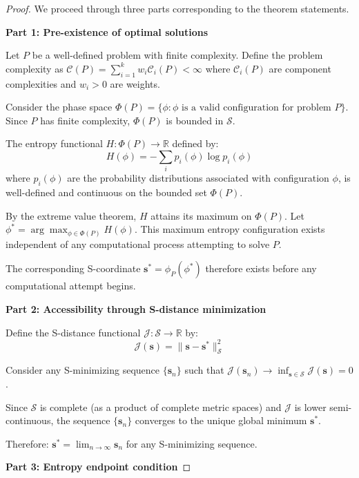 \documentclass[12pt,a4paper]{article}
\begin{document}
\begin{proof}
We proceed through three parts corresponding to the theorem statements.

\textbf{Part 1: Pre-existence of optimal solutions}

Let $P$ be a well-defined problem with finite complexity. Define the problem complexity as $\mathcal{C}(P) = \sum_{i=1}^k w_i \mathcal{C}_i(P) < \infty$ where $\mathcal{C}_i(P)$ are component complexities and $w_i > 0$ are weights.

Consider the phase space $\Phi(P) = \{\phi : \phi \text{ is a valid configuration for problem } P\}$. Since $P$ has finite complexity, $\Phi(P)$ is bounded in $\mathcal{S}$.

The entropy functional $H: \Phi(P) \to \mathbb{R}$ defined by:
\begin{equation}
H(\phi) = -\sum_{i} p_i(\phi) \log p_i(\phi)
\end{equation}
where $p_i(\phi)$ are the probability distributions associated with configuration $\phi$, is well-defined and continuous on the bounded set $\Phi(P)$.

By the extreme value theorem, $H$ attains its maximum on $\Phi(P)$. Let $\phi^* = \arg\max_{\phi \in \Phi(P)} H(\phi)$. This maximum entropy configuration exists independent of any computational process attempting to solve $P$.

The corresponding S-coordinate $\mathbf{s}^* = \phi_P(\phi^*)$ therefore exists before any computational attempt begins.

\textbf{Part 2: Accessibility through S-distance minimization}

Define the S-distance functional $\mathcal{J}: \mathcal{S} \to \mathbb{R}$ by:
\begin{equation}
\mathcal{J}(\mathbf{s}) = \|\mathbf{s} - \mathbf{s}^*\|_{\mathcal{S}}^2
\end{equation}

Consider any S-minimizing sequence $\{\mathbf{s}_n\}$ such that $\mathcal{J}(\mathbf{s}_n) \to \inf_{\mathbf{s} \in \mathcal{S}} \mathcal{J}(\mathbf{s}) = 0$.

Since $\mathcal{S}$ is complete (as a product of complete metric spaces) and $\mathcal{J}$ is lower semi-continuous, the sequence $\{\mathbf{s}_n\}$ converges to the unique global minimum $\mathbf{s}^*$.

Therefore: $\mathbf{s}^* = \lim_{n \to \infty} \mathbf{s}_n$ for any S-minimizing sequence.

\textbf{Part 3: Entropy endpoint condition}


\end{proof}
\end{document}
